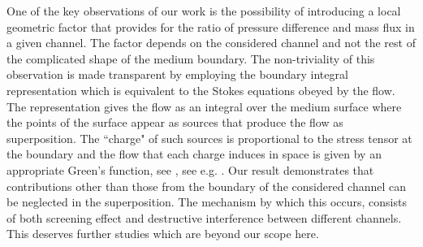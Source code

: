 \documentclass[draft]{agujournal2019}
\begin{document}


One of the key observations of our work is the possibility of introducing a local geometric factor that provides for the ratio of pressure difference and mass flux in a given channel. The factor depends on the considered channel and not the rest of the complicated shape of the medium boundary. The non-triviality of this observation is made transparent by employing the boundary integral representation which is equivalent to the Stokes equations obeyed by the flow. The representation gives the flow as an integral over the medium surface where the points of the surface appear as sources that produce the flow as superposition. The ``charge" of such sources is proportional to the stress tensor at the boundary and the flow that each charge induces in space is given by an appropriate Green's function, see , see e.g. \cite{pozrikidis_boundary_1992}. Our result demonstrates that contributions other than those from the boundary of the considered channel can be neglected in the superposition. The mechanism by which this occurs, consists of both screening effect and destructive interference between different channels. This deserves further studies which are beyond our scope here.
\end{document}
